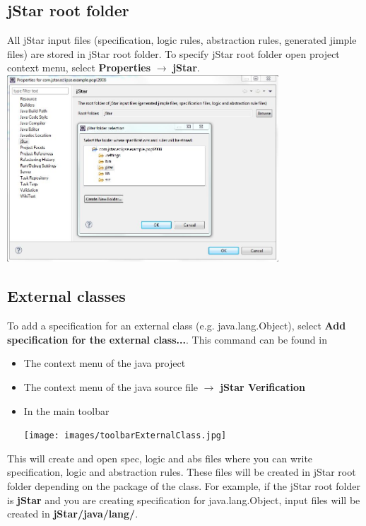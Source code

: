 \documentclass{article}
\begin{document}
\subsection{jStar root folder}
\label{sec:jstarrootfolder}

All jStar input files (specification, logic rules, abstraction rules, generated jimple files) are stored in jStar root folder. To specify jStar root folder open project context menu, select {\bf Properties} $\rightarrow$ {\bf jStar}.\\

\includegraphics[width=4in]{images/rootFolder.jpg}

\subsection{External classes}
\label{sec:externalclasses}

To add a specification for an external class (e.g. java.lang.Object), select {\bf Add specification for the external class...}. This command can be found in 
\begin{itemize}
\item The context menu of the java project
\item The context menu of the java source file $\rightarrow$ {\bf jStar Verification} 
\item In the main toolbar

\texttt{[image: images/toolbarExternalClass.jpg]}\\
\end{itemize}
This will create and open spec, logic and abs files where you can write specification, logic and abstraction rules. These files will be created in jStar root folder depending on the package of the class. For example, if the jStar root folder is {\bf jStar} and you are creating specification for java.lang.Object, input files will be created in {\bf jStar/java/lang/}.
\end{document}
